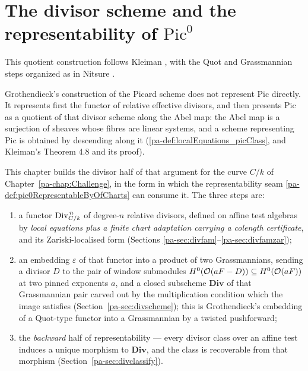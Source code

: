 \section{The divisor scheme and the representability of \(\mathrm{Pic}^0\)}
\label{pa-chap:DivisorScheme}

This quotient construction follows Kleiman \cite{kleiman-picard}, with the Quot and
Grassmannian steps organized as in Nitsure \cite{nitsure-hilbert-quot}.

Grothendieck's construction of the Picard scheme does not represent \(\mathrm{Pic}\)
directly. It represents first the functor of relative effective divisors, and then
presents \(\mathrm{Pic}\) as a quotient of that divisor scheme along the Abel map: the
Abel map is a surjection of sheaves whose fibres are linear systems, and a scheme
representing \(\mathrm{Pic}\) is obtained by descending along it
(\ref{pa-def:localEquations_picClass}, and Kleiman's Theorem 4.8 and its proof).

This chapter builds the divisor half of that argument for the curve \(C/k\) of
Chapter~\ref{pa-chap:Challenge}, in the form in which the representability seam
\ref{pa-def:pic0RepresentableByOfCharts} can consume it. The three steps are:

\begin{enumerate}
  \item a functor \(\operatorname{Div}^{\,n}_{C/k}\) of degree-\(n\) relative divisors, defined on affine
    test algebras by \emph{local equations plus a finite chart adaptation carrying a
    colength certificate}, and its Zariski-localised form (Sections
    \ref{pa-sec:divfam}--\ref{pa-sec:divfamzar});
  \item an embedding \(\varepsilon\) of that functor into a product of two Grassmannians,
    sending a divisor \(D\) to the pair of window submodules
    \(H^0(\mathcal{O}(aF - D)) \subseteq H^0(\mathcal{O}(aF))\) at two pinned exponents \(a\), and a closed
    subscheme \(\mathbf{Div}\) of that Grassmannian pair carved out by the multiplication
    condition which the image satisfies (Section~\ref{pa-sec:divscheme}); this is
    Grothendieck's embedding of a Quot-type functor into a Grassmannian by a twisted
    pushforward;
  \item the \emph{backward} half of representability --- every divisor class over an affine
    test induces a unique morphism to \(\mathbf{Div}\), and the class is recoverable from
    that morphism (Section~\ref{pa-sec:divclassify}).
\end{enumerate}

